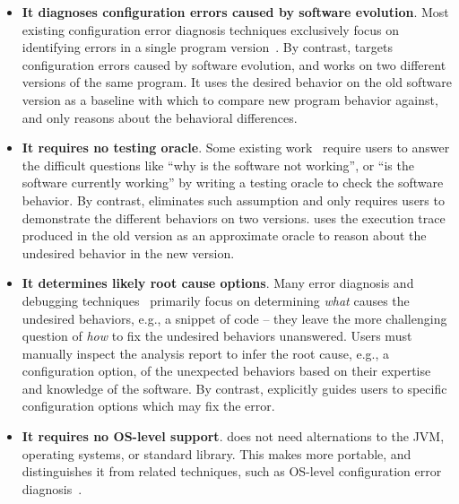 \begin{itemize}
\item \textbf{It diagnoses configuration errors caused by software evolution}.
Most existing configuration error diagnosis techniques
exclusively focus on identifying errors in a single program
version~\cite{Wang:2004:AMT, Rabkin:2011:PPC, Whitaker:2004:CDS,
Zhang:2013:ADS, Attariyan:2010:ACT, Su:2007:AIC, Attariyan:2008:UCD, xray
}. By contrast, \ourtool targets
configuration errors caused by software evolution, and
works on two different versions of the same program. 
It uses the desired behavior on the old software version
as a baseline with which to compare new program behavior against, and only
reasons about the behavioral differences.


\item \textbf{It requires no testing oracle}.
Some existing work~\cite{Rabkin:2011:PPC, Whitaker:2004:CDS,
Attariyan:2010:ACT, Su:2007:AIC} require users to answer the difficult
questions like ``why is the software not working'', or
``is the software currently working'' by writing a testing
oracle to check the software behavior. By contrast,
\ourtool eliminates such assumption and only requires users to
demonstrate the different behaviors on two versions.
\ourtool uses the execution trace produced in the old
version as an approximate oracle to
reason about the undesired behavior in the new version.

\item \textbf{It determines likely root cause options}.
Many error diagnosis and debugging techniques~\cite{dd, autoflow}
primarily focus on
determining \textit{what} causes the undesired behaviors, e.g.,
a snippet of code -- they leave the more challenging
question of \textit{how} to fix the undesired behaviors
unanswered. Users must manually inspect the analysis
report to infer
the root cause, e.g., a configuration option,
of the unexpected behaviors 
based on their expertise and knowledge of the software.
By contrast, \ourtool explicitly guides users to specific
configuration options which may fix the error.

\item \textbf{It requires no OS-level support}. \ourtool
does not need alternations to the JVM, operating systems, or
standard library. This makes \ourtool more portable, and
distinguishes it from related techniques, such as
OS-level configuration error diagnosis~\cite{Whitaker:2004:CDS, Su:2007:AIC}.

\end{itemize}

